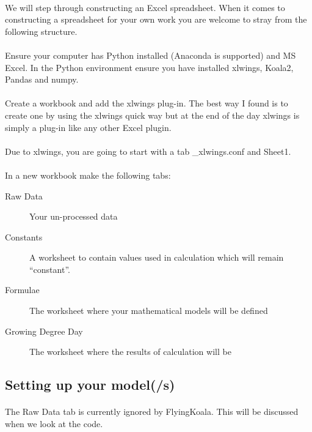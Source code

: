 \documentclass[12pt,a4paper,twoside,openright,titlepage]{article}
\begin{document}
\paragraph{} We will step through constructing an Excel spreadsheet. When it comes to constructing a spreadsheet for your own work you are welcome to stray from the following structure.

\paragraph{} Ensure your computer has Python installed (Anaconda is supported) and MS Excel. In the Python environment ensure you have installed xlwings, Koala2, Pandas and numpy.

\paragraph{} Create a workbook and add the xlwings plug-in. The best way I found is to create one by using the xlwings quick way but at the end of the day xlwings is simply a plug-in like any other Excel plugin.

\paragraph{} Due to xlwings, you are going to start with a tab \_xlwings.conf and Sheet1.

\paragraph{} In a new workbook make the following tabs:

\begin{description}
	\item[Raw Data] Your un-processed data
	\item[Constants] A worksheet to contain values used in calculation which will remain ``constant''.
	\item[Formulae] The worksheet where your mathematical models will be defined
	\item[Growing Degree Day] The worksheet where the results of calculation will be
\end{description}

\subsection{Setting up your model(/s)}

\paragraph{} The Raw Data tab is currently ignored by FlyingKoala. This will be discussed when we look at the code.
\end{document}
